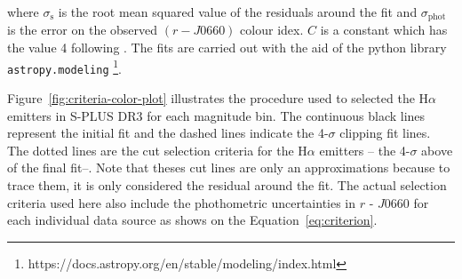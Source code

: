 \documentclass[fleqn,usenatbib]{mnras}
\begin{document}
 where $\sigma_{\mathrm{s}}$ is the root mean squared value of the residuals around
 the fit and $\sigma_{\mathrm{phot}}$ is the error on the observed $(r - J0660)$ colour idex.
 $C$ is a constant which has the value 4 following \citet{Wevers:2017}.
The fits are carried out with the aid of the python library \texttt{astropy.modeling}
\footnote{https://docs.astropy.org/en/stable/modeling/index.html}.

Figure~\ref{fig:criteria-color-plot} illustrates the procedure used to selected the H{$\alpha$}
emitters in S-PLUS DR3 for each magnitude bin. The continuous black lines represent the initial
fit and  the dashed lines indicate the 4-$\sigma$ clipping fit lines. The dotted lines are
the cut selection criteria for the H{$\alpha$} emitters -- the 4-$\sigma$ above of the final
fit--. Note that theses cut lines are only an approximations because to trace them,
it is only considered the residual around the fit. The actual selection criteria used here
also include the phothometric uncertainties in $r$ - $J$0660 for each individual data source as
shows on the Equation~\ref{eq:criterion}.
\end{document}
